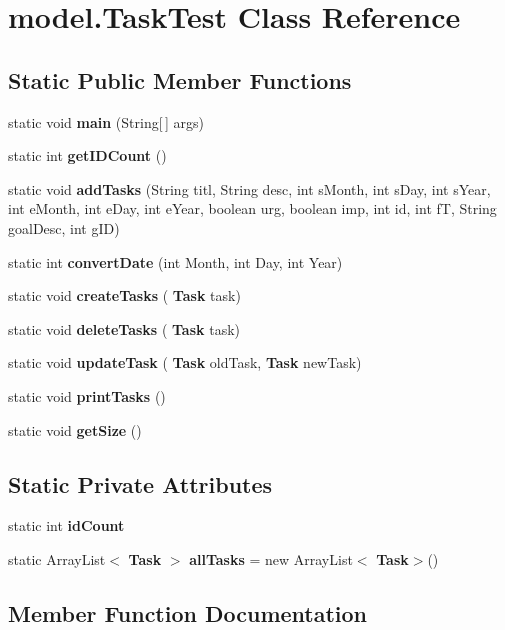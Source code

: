 \section{model.\+Task\+Test Class Reference}
\label{classmodel_1_1_task_test}
\subsection*{Static Public Member Functions}
\begin{DoxyCompactItemize}
\item 
static void \textbf{ main} (String[$\,$] args)
\item 
static int \textbf{ get\+I\+D\+Count} ()
\item 
static void \textbf{ add\+Tasks} (String titl, String desc, int s\+Month, int s\+Day, int s\+Year, int e\+Month, int e\+Day, int e\+Year, boolean urg, boolean imp, int id, int fT, String goal\+Desc, int g\+ID)
\item 
static int \textbf{ convert\+Date} (int Month, int Day, int Year)
\item 
static void \textbf{ create\+Tasks} (\textbf{ Task} task)
\item 
static void \textbf{ delete\+Tasks} (\textbf{ Task} task)
\item 
static void \textbf{ update\+Task} (\textbf{ Task} old\+Task, \textbf{ Task} new\+Task)
\item 
static void \textbf{ print\+Tasks} ()
\item 
static void \textbf{ get\+Size} ()
\end{DoxyCompactItemize}
\subsection*{Static Private Attributes}
\begin{DoxyCompactItemize}
\item 
static int \textbf{ id\+Count}
\item 
static Array\+List$<$ \textbf{ Task} $>$ \textbf{ all\+Tasks} = new Array\+List$<$\textbf{ Task}$>$()
\end{DoxyCompactItemize}


\subsection{Member Function Documentation}
\mbox{\label{classmodel_1_1_task_test_a7d53585993952eafbf07b771159b0af2}} 
